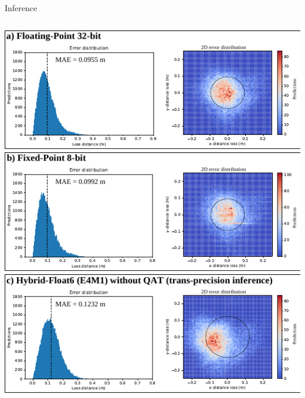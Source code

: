 \begin{frame}{Inference}
	\begin{columns}[T] %
		\begin{column}{0.5\textwidth}
			\centering
			\includegraphics[width=0.95\linewidth]{slides/figures/model_evaluation_a.pdf} %
			\pause %
			\includegraphics[width=0.95\linewidth]{slides/figures/model_evaluation_b.pdf} %
			\pause %
			\includegraphics[width=0.95\linewidth]{slides/figures/model_evaluation_c.pdf} %
			\pause %
		\end{column}
		

\end{columns}
\end{frame}
